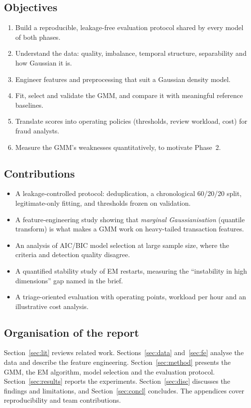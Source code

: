 \documentclass[12pt]{article}
\begin{document}
\subsection{Objectives}
\begin{enumerate}
\item Build a reproducible, leakage-free evaluation protocol shared by every model of both phases.
\item Understand the data: quality, imbalance, temporal structure, separability and how Gaussian it is.
\item Engineer features and preprocessing that suit a Gaussian density model.
\item Fit, select and validate the GMM, and compare it with meaningful reference baselines.
\item Translate scores into operating policies (thresholds, review workload, cost) for fraud analysts.
\item Measure the GMM's weaknesses quantitatively, to motivate Phase~2.
\end{enumerate}

\subsection{Contributions}
\begin{itemize}
\item A leakage-controlled protocol: deduplication, a chronological 60/20/20 split, legitimate-only fitting, and
thresholds frozen on validation.
\item A feature-engineering study showing that \emph{marginal Gaussianisation} (quantile transform) is what makes a
GMM work on heavy-tailed transaction features.
\item An analysis of AIC/BIC model selection at large sample size, where the criteria and detection quality disagree.
\item A quantified stability study of EM restarts, measuring the ``instability in high dimensions'' gap named in the
brief.
\item A triage-oriented evaluation with operating points, workload per hour and an illustrative cost analysis.
\end{itemize}

\subsection{Organisation of the report}
Section~\ref{sec:lit} reviews related work. Sections~\ref{sec:data} and~\ref{sec:fe} analyse the data and describe the
feature engineering. Section~\ref{sec:method} presents the GMM, the EM algorithm, model selection and the evaluation
protocol. Section~\ref{sec:results} reports the experiments. Section~\ref{sec:disc} discusses the findings and
limitations, and Section~\ref{sec:concl} concludes. The appendices cover reproducibility and team contributions.
\end{document}
